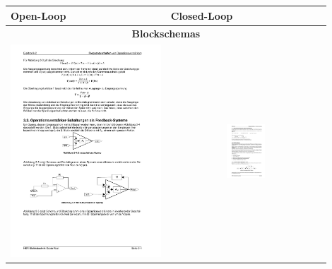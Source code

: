 \begin{tabular}{|p{0.45\linewidth}|p{0.45\linewidth}|}
	\hline
	\textbf{Open-Loop}
		& \textbf{Closed-Loop}\\
	\hline
	\multicolumn{2}{|c|}{\textbf{Blockschemas}}\\
	\hline
	\begin{minipage}{0.4\linewidth}
	 	\includegraphics{./pictures/opAmpOL.pdf}
	\end{minipage}
		& \begin{minipage}{0.4\linewidth}
			\includegraphics[height=2cm, width=8cm]{./pictures/opAmpCL.pdf}
		  \end{minipage}\\

\end{tabular}
